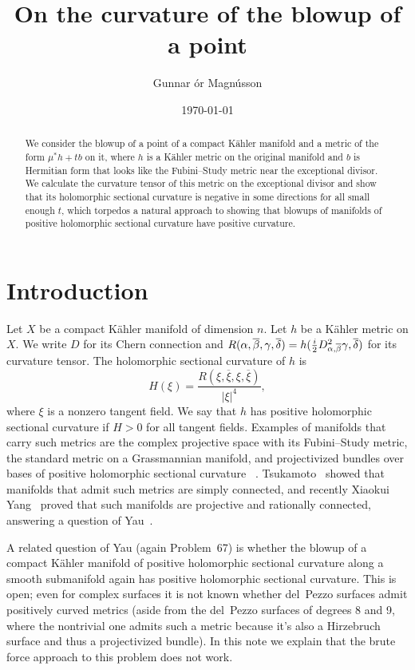 \documentclass[10pt,a4paper]{amsart}
\author{Gunnar \TH\'or Magn\'usson}
\date{\today}
\title{On the curvature of the blowup of a point}
\def\fs{b}
\def\ov#1{\overline{#1}}
\def\hsc{holomorphic sectional curvature}
\begin{document}
\begin{abstract}
We consider the blowup of a point of a compact K\"ahler manifold and a metric
of the form $\mu^*h + t \fs$ on it, where $h$ is a K\"ahler metric on the
original manifold and $\fs$ is Hermitian form that looks like the
Fubini--Study metric near the exceptional divisor.
We calculate the curvature tensor of this metric on the exceptional divisor
and show that its holomorphic sectional curvature is negative in some
directions for all small enough $t$, which torpedos a natural approach to
showing that blowups of manifolds of positive holomorphic sectional curvature
have positive curvature.
\end{abstract}

\maketitle


\section*{Introduction}

Let $X$ be a compact K\"ahler manifold of dimension $n$.
Let $h$ be a K\"ahler metric on $X$.
We write $D$ for its Chern connection and
$R(\alpha,\ov\beta,\gamma,\ov\delta) = h(\frac i2
D^2_{\smash{\alpha,\ov\beta}}\gamma, \ov\delta)$ for its curvature tensor. The
holomorphic sectional curvature of $h$ is
$$
H(\xi)
= \frac{R(\xi, \ov\xi, \xi, \ov\xi)}{|\xi|^4},
$$
where $\xi$ is a nonzero tangent field.
We say that $h$ has positive holomorphic sectional curvature if $H > 0$ for all
tangent fields.
Examples of manifolds that carry such metrics are the complex projective space
with its Fubini--Study metric, the standard metric on a Grassmannian manifold,
and projectivized bundles over bases of positive holomorphic sectional curvature
~\cite{alvarez2018projectivized}.
Tsukamoto~\cite{tsukamoto1957kahlerian} showed that manifolds that admit such
metrics are simply connected, and recently Xiaokui Yang~\cite{yang2017rc}
proved that such manifolds are projective and rationally connected, answering a
question of Yau~\cite[Problem~67]{yau1993open}.

A related question of Yau (again Problem~67) is whether the blowup of a compact
K\"ahler manifold of positive \hsc{} along a smooth submanifold again has
positive \hsc.
This is open; even for complex surfaces it is not known whether del~Pezzo
surfaces admit positively curved metrics (aside from the del~Pezzo surfaces of
degrees 8 and 9, where the nontrivial one admits such a metric because it's
also a Hirzebruch surface and thus a projectivized bundle). In this note we
explain that the brute force approach to this problem does not work.
\end{document}
